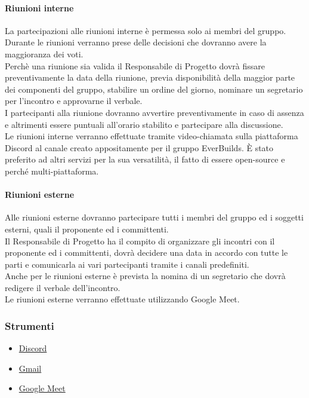 			\paragraph{Riunioni interne}
				La partecipazioni alle riunioni interne è permessa solo ai membri del gruppo.		\\
				Durante le riunioni verranno prese delle decisioni che dovranno avere la maggioranza dei voti.\\
				Perchè una riunione sia valida il Responsabile di Progetto dovrà fissare preventivamente la data della riunione, previa disponibilità della maggior parte dei componenti del gruppo, stabilire un ordine del giorno, nominare un segretario per l’incontro e approvarne il verbale.\\
				I partecipanti alla riunione dovranno avvertire preventivamente in caso di assenza e altrimenti essere puntuali all’orario stabilito e partecipare alla discussione.\\
				Le riunioni interne verranno effettuate tramite video-chiamata sulla piattaforma Discord al canale creato appositamente per il gruppo EverBuilds. È stato preferito ad altri servizi per la sua versatilità, il fatto di essere open-source e perché multi-piattaforma.\\
			\paragraph{Riunioni esterne}
				Alle riunioni esterne dovranno partecipare tutti i membri del gruppo ed i soggetti esterni, quali il proponente ed i committenti.\\
				Il Responsabile di Progetto ha il compito di organizzare gli incontri con il proponente ed i committenti, dovrà decidere una data in accordo con tutte le parti e comunicarla ai vari partecipanti tramite i canali predefiniti.\\
				Anche per le riunioni esterne è prevista la nomina di un segretario che dovrà redigere il verbale dell’incontro.\\
				Le riunioni esterne verranno effettuate utilizzando Google Meet.\\
		\subsubsection{Strumenti}
			\begin{itemize}
				\item \href{https://discordapp.com/company/}{Discord}
				\item \href{https://www.google.com/intl/it/gmail/about/}{Gmail }
				\item \href{https://meet.google.com/?hs=197\&pli=1\&authuser=0}{Google Meet}
			\end{itemize}

